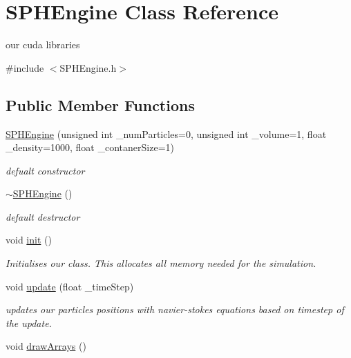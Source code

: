 \hypertarget{class_s_p_h_engine}{\section{S\-P\-H\-Engine Class Reference}
\label{class_s_p_h_engine}
}


our cuda libraries  




{\ttfamily \#include $<$S\-P\-H\-Engine.\-h$>$}

\subsection*{Public Member Functions}
\begin{DoxyCompactItemize}
\item 
\hyperlink{class_s_p_h_engine_ac997f2a996e7c7778263e160a5dd005f}{S\-P\-H\-Engine} (unsigned int \-\_\-num\-Particles=0, unsigned int \-\_\-volume=1, float \-\_\-density=1000, float \-\_\-contaner\-Size=1)
\begin{DoxyCompactList}\small\item\em defualt constructor \end{DoxyCompactList}\item 
\hypertarget{class_s_p_h_engine_a0969407c141667c1147d409a0397257d}{\hyperlink{class_s_p_h_engine_a0969407c141667c1147d409a0397257d}{$\sim$\-S\-P\-H\-Engine} ()}\label{class_s_p_h_engine_a0969407c141667c1147d409a0397257d}

\begin{DoxyCompactList}\small\item\em default destructor \end{DoxyCompactList}\item 
\hypertarget{class_s_p_h_engine_a0df6d1b33d50afb152e2992de5af5700}{void \hyperlink{class_s_p_h_engine_a0df6d1b33d50afb152e2992de5af5700}{init} ()}\label{class_s_p_h_engine_a0df6d1b33d50afb152e2992de5af5700}

\begin{DoxyCompactList}\small\item\em Initialises our class. This allocates all memory needed for the simulation. \end{DoxyCompactList}\item 
void \hyperlink{class_s_p_h_engine_a1a17b5c04756850b68cf95b917019241}{update} (float \-\_\-time\-Step)
\begin{DoxyCompactList}\small\item\em updates our particles positions with navier-\/stokes equations based on timestep of the update. \end{DoxyCompactList}\item 
\hypertarget{class_s_p_h_engine_a91f224d67175615716059dba23c38a98}{void \hyperlink{class_s_p_h_engine_a91f224d67175615716059dba23c38a98}{draw\-Arrays} ()}\label{class_s_p_h_engine_a91f224d67175615716059dba23c38a98}


\end{DoxyCompactItemize}
